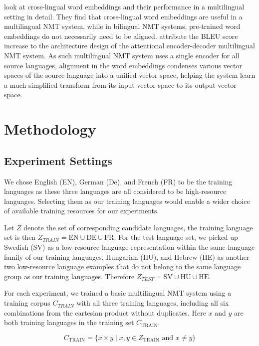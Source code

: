 \documentclass[thesis,fonts=libertine]{cluu}
\begin{document}
\textcite{Qi:2018aa} look at cross-lingual word embeddings and their performance in a multilingual setting in detail. They find that cross-lingual word embeddings are useful in a multilingual NMT system, while in bilingual NMT systems, pre-trained word embeddings do not necessarily need to be aligned. \textcite{Qi:2018aa} attribute the BLEU score increase to the architecture design of the attentional encoder-decoder multilingual NMT system. As such multilingual NMT system uses a single encoder for all source languages, alignment in the word embeddings condenses various vector spaces of the source language into a unified vector space, helping the system learn a much-simplified transform from its input vector space to its output vector space.

\chapter{Methodology}
\label{chap:method}

\section{Experiment Settings}
\label{sec:initial_exp_settings}

We chose English (EN), German (De), and French (FR) to be the training languages as these three languages are all considered to be high-resource languages. Selecting them as our training languages would enable a wider choice of available training resources for our experiments.

Let $Z$ denote the set of corresponding candidate languages, the training language set is then $Z_{TRAIN} = {\text{EN}\cup \text{DE}\cup \text{FR}}$. For the test language set, we picked up Swedish (SV) as a low-resource language representation within the same language family of our training languages, Hungarian (HU), and Hebrew (HE) as another two low-resource language examples that do not belong to the same language group as our training languages. Therefore $Z_{TEST} = {\text{SV}\cup \text{HU}\cup \text{HE}}$.

For each experiment, we trained a basic multilingual NMT system using a training corpus $C_{TRAIN}$ with all three training languages, including all six combinations from the cartesian product without duplicates. Here $x$ and $y$ are both training languages in the training set $C_{\text{TRAIN}}$.

\begin{equation*}
  C_{\text{TRAIN}} = \{x \times y \mid x, y \in Z_{\text{TRAIN}} \text{ and } x \neq y\}
\end{equation*}
\end{document}
